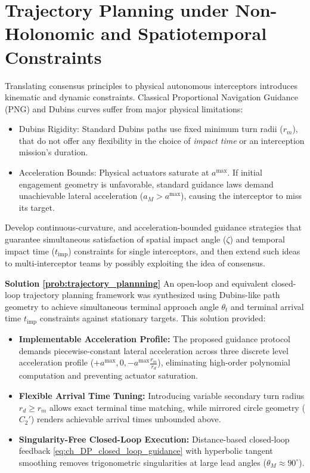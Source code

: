 \documentclass[openright,twoside]{iitbthesis}
\begin{document}
\section{Trajectory Planning under Non-Holonomic and Spatio\-temporal Constraints}
Translating consensus principles to physical autonomous interceptors introduces kinematic and dynamic constraints. Classical Proportional Navigation Guidance (PNG) and Dubins curves suffer from major physical limitations:
\begin{itemize}
    \item Dubins Rigidity: Standard Dubins paths use fixed minimum turn radii ($r_m$), that do not offer any flexibility in the choice of \emph{impact time} or an interception mission's duration.
    \item Acceleration Bounds: Physical actuators saturate at $a^{\text{max}}$. If initial engagement geometry is unfavorable, standard guidance laws demand unachievable lateral acceleration ($a_M > a^{\text{max}}$), causing the interceptor to miss its target. 
\end{itemize}
\begin{problem}\label{prob:trajectory_plannning}
    Develop continuous-curvature, and acceleration-bounded guidance strategies that guarantee simultaneous satisfaction of spatial impact angle ($\zeta$) and temporal impact time ($t_{\text{imp}}$) constraints for single interceptors, and then extend such ideas to multi-interceptor teams by possibly exploiting the idea of consensus.
\end{problem}
\noindent \textbf{Solution \ref{prob:trajectory_plannning}}
An open-loop and equivalent closed-loop trajectory planning framework was synthesized using Dubins-like path geometry to achieve simultaneous terminal approach angle $\theta_t$ and terminal arrival time $t_{\text{imp}}$ constraints against stationary targets. This solution provided:
\begin{itemize}
    \item \textbf{Implementable Acceleration Profile:} The proposed guidance protocol demands piecewise-constant lateral acceleration across three discrete level acceleration profile ($+a^{\max}, 0, -a^{\max} \frac{r_m}{r_d}$), eliminating high-order polynomial computation and preventing actuator saturation.
    \item \textbf{Flexible Arrival Time Tuning:} Introducing variable secondary turn radius $r_d \ge r_m$ allows exact terminal time matching, while mirrored circle geometry ($C_2'$) renders achievable arrival times unbounded above.
    \item \textbf{Singularity-Free Closed-Loop Execution:} Distance-based closed-loop feedback \eqref{eq:ch_DP_closed_loop_guidance} with hyperbolic tangent smoothing removes trigonometric singularities at large lead angles ($\theta_M \approx 90^\circ$).
\end{itemize}
\end{document}
